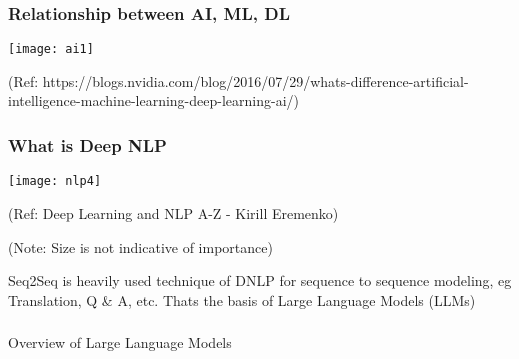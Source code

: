 \begin{frame}[fragile]\frametitle{Relationship between AI, ML, DL}
\begin{center}
\texttt{[image: ai1]}
\end{center}
{\tiny (Ref: https://blogs.nvidia.com/blog/2016/07/29/whats-difference-artificial-intelligence-machine-learning-deep-learning-ai/)}
\end{frame}



\begin{frame}[fragile]\frametitle{What is Deep NLP}
\begin{center}
\texttt{[image: nlp4]}

\tiny{(Ref: Deep Learning and NLP A-Z - Kirill Eremenko)}

\tiny{(Note: Size is not indicative of importance)}
\end{center}

Seq2Seq is heavily used technique of DNLP for sequence to sequence modeling, eg Translation, Q \& A, etc. Thats the basis of Large Language Models (LLMs)

	

\end{frame}


\begin{frame}[fragile]\frametitle{}
\begin{center}
{\Large Overview of Large Language Models}
\end{center}
\end{frame}



